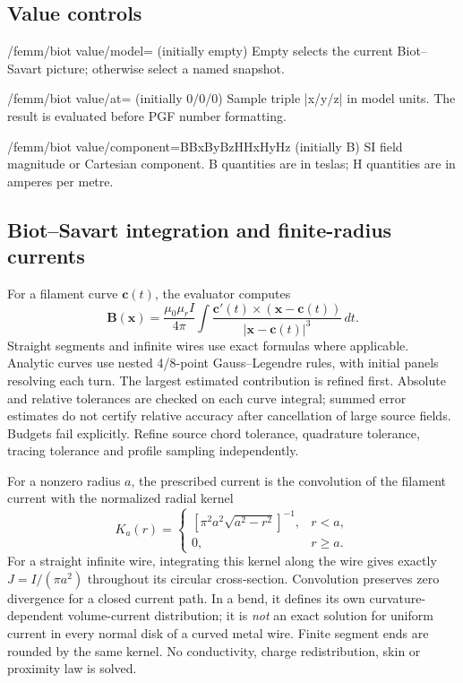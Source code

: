 \subsection{Value controls}
\begin{key}{/femm/biot value/model= (initially empty)}
Empty selects the current Biot--Savart picture; otherwise select a named snapshot.
\end{key}
\begin{key}{/femm/biot value/at= (initially 0/0/0)}
Sample triple |x/y/z| in model units. The result is evaluated before PGF number formatting.
\end{key}
\begin{key}{/femm/biot value/component=B\textbar Bx\textbar By\textbar Bz\textbar H\textbar Hx\textbar Hy\textbar Hz (initially B)}
SI field magnitude or Cartesian component. B quantities are in teslas; H quantities are in amperes per metre.
\end{key}

\subsection{Biot--Savart integration and finite-radius currents}
For a filament curve $\mathbf c(t)$, the evaluator computes
\[
 \mathbf B(\mathbf x)=\frac{\mu_0\mu_r I}{4\pi}
 \int\frac{\mathbf c'(t)\mathbin\times(\mathbf x-\mathbf c(t))}
 {|\mathbf x-\mathbf c(t)|^3}\,dt.
\]
Straight segments and infinite wires use exact formulas where applicable.
Analytic curves use nested 4/8-point Gauss--Legendre rules, with initial panels
resolving each turn. The largest estimated contribution is refined first.
Absolute and relative tolerances are checked on each curve integral; summed
error estimates do not certify relative accuracy after cancellation of large
source fields. Budgets fail explicitly. Refine source chord tolerance,
quadrature tolerance, tracing tolerance and profile sampling independently.

For a nonzero radius $a$, the prescribed current is the convolution of the
filament current with the normalized radial kernel
\[
 K_a(r)=\begin{cases}
 [\pi^2 a^2\sqrt{a^2-r^2}]^{-1},&r<a,\\
 0,&r\geq a.
 \end{cases}
\]
For a straight infinite wire, integrating this kernel along the wire gives
exactly $J=I/(\pi a^2)$ throughout its circular cross-section. Convolution
preserves zero divergence for a closed current path. In a bend, it defines
its own curvature-dependent volume-current distribution; it is \emph{not}
an exact solution for uniform current in every normal disk of a curved metal
wire. Finite segment ends are rounded by the same kernel. No conductivity,
charge redistribution, skin or proximity law is solved.

